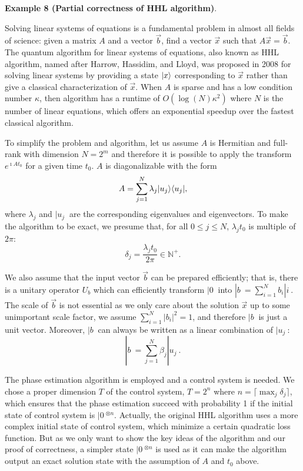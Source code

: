 \noindent\textbf{Example 8 (Partial correctness of HHL algorithm)}.

Solving linear systems of equations is a fundamental problem in almost all fields of science: given a matrix $A$ and a vector $\vec{b}$, find a vector $\vec{x}$ such that $A\vec{x} = \vec{b}$. The quantum algorithm for linear systems of equations, also known as HHL algorithm, named after Harrow, Hassidim, and Lloyd, was proposed in 2008 for solving linear systems \cite{HHL08} by providing a state $|x\rangle$ corresponding to $\vec{x}$ rather than give a classical characterization of $\vec{x}$.
When $A$ is sparse and has a low condition number $\kappa$, then algorithm has a runtime of $O(\log(N)\kappa^2)$ where $N$ is the number of linear equations, which offers an exponential speedup over the fastest classical algorithm.

To simplify the problem and algorithm, let us assume $A$ is Hermitian and full-rank with dimension $N = 2^m$ and therefore it is possible to apply the transform $e^{\imath A t_0}$ for a given time $t_0$. $A$ is diagonalizable with the form
$$A = \sum_{j = 1}^N\lambda_j|u_j\rangle\langle u_j|,$$ where $\lambda_j$ and $|u_j\>$ are the corresponding eigenvalues and eigenvectors. To make the algorithm to be exact, we presume that, for all $0\le j\le N$, $\lambda_jt_0$ is multiple of $2\pi$: $$\delta_j = \frac{\lambda_jt_0}{2\pi}\in \mathbb{N}^+.$$

We also assume that the input vector $\vec{b}$ can be prepared efficiently; that is, there is a unitary operator $U_b$ which can efficiently transform $|0\>$ into $|b\> = \sum_{i = 1}^Nb_i|i\>$. The scale of $\vec{b}$ is not essential as we only care about the solution $\vec{x}$ up to some unimportant scale factor, we assume $\sum_{i = 1}^N|b_i|^2 = 1$, and therefore $|b\>$ is just a unit vector. Moreover, $|b\>$ can always be written as a linear combination of $|u_j\>$:
$$|b\> = \sum_{j = 1}^N\beta_j|u_j\>.$$

The phase estimation algorithm is employed and a control system is needed. We chose a proper dimension $T$ of the control system, $T = 2^n$ where $n = \lceil \max_j \delta_j \rceil$, which ensures that the phase estimation succeed with probability 1 if the initial state of control system is $|0\>^{\otimes n}$. Actually, the original HHL algorithm uses a more complex initial state of control system, which minimize a certain quadratic loss function. But as we only want to show the key ideas of the algorithm and our proof of correctness, a simpler state $|0\>^{\otimes n}$ is used as it can make the algorithm output an exact solution state with the assumption of $A$ and $t_0$ above.

